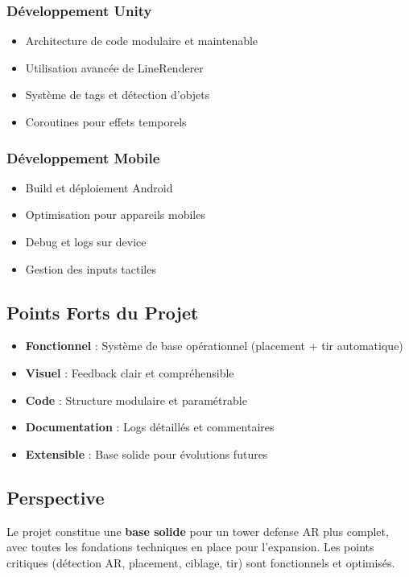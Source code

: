 \documentclass[12pt,a4paper]{article}
\begin{document}
\subsubsection{Développement Unity}
\begin{itemize}[label=$\checkmark$]
    \item Architecture de code modulaire et maintenable
    \item Utilisation avancée de LineRenderer
    \item Système de tags et détection d'objets
    \item Coroutines pour effets temporels
\end{itemize}

\subsubsection{Développement Mobile}
\begin{itemize}[label=$\checkmark$]
    \item Build et déploiement Android
    \item Optimisation pour appareils mobiles
    \item Debug et logs sur device
    \item Gestion des inputs tactiles
\end{itemize}

\subsection{Points Forts du Projet}

\begin{itemize}[label=$\star$]
    \item \textbf{Fonctionnel} : Système de base opérationnel (placement + tir automatique)
    \item \textbf{Visuel} : Feedback clair et compréhensible
    \item \textbf{Code} : Structure modulaire et paramétrable
    \item \textbf{Documentation} : Logs détaillés et commentaires
    \item \textbf{Extensible} : Base solide pour évolutions futures
\end{itemize}

\subsection{Perspective}

Le projet constitue une \textbf{base solide} pour un tower defense AR plus complet, avec toutes les fondations techniques en place pour l'expansion. Les points critiques (détection AR, placement, ciblage, tir) sont fonctionnels et optimisés.
\end{document}
